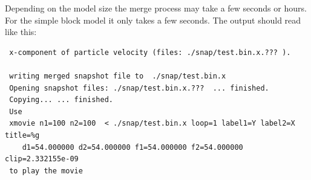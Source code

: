 \documentclass[11pt,onecolumn,oneside]{article}
\begin{document}

Depending on the model size the merge process may take a few seconds or hours. For the simple block model it only takes a few seconds. The output should read like this:

\begin{verbatim}
 x-component of particle velocity (files: ./snap/test.bin.x.??? ).

 writing merged snapshot file to  ./snap/test.bin.x
 Opening snapshot files: ./snap/test.bin.x.???  ... finished.
 Copying... ... finished.
 Use
 xmovie n1=100 n2=100  < ./snap/test.bin.x loop=1 label1=Y label2=X title=%g 
    d1=54.000000 d2=54.000000 f1=54.000000 f2=54.000000 clip=2.332155e-09
 to play the movie
\end{verbatim} 

%
\newpage


\end{document}
